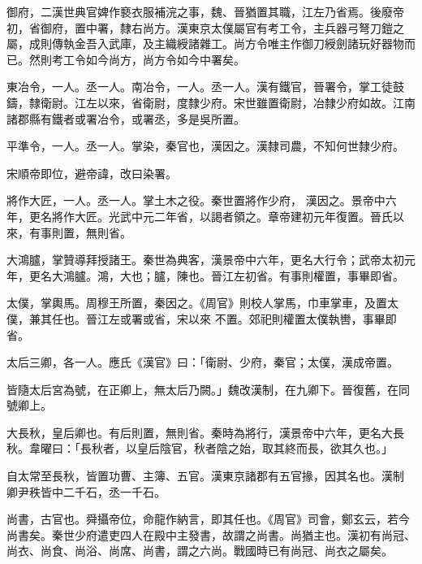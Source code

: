 \begin{pinyinscope}
 御府，二漢世典官婢作褻衣服補浣之事，魏、晉猶置其職，江左乃省焉。後廢帝初，省御府，置中署，隸右尚方。漢東京太僕屬官有考工令，主兵器弓弩刀鎧之屬，成則傳執金吾入武庫，及主織綬諸雜工。尚方令唯主作御刀綬劍諸玩好器物而已。然則考工令如今尚方，尚方令如今中署矣。



 東冶令，一人。丞一人。南冶令，一人。丞一人。漢有鐵官，晉署令，掌工徒鼓鑄，隸衛尉。江左以來，省衛尉，度隸少府。宋世雖置衛尉，冶隸少府如故。江南諸郡縣有鐵者或署冶令，或署丞，多是吳所置。



 平準令，一人。丞一人。掌染，秦官也，漢因之。漢隸司農，不知何世隸少府。



 宋順帝即位，避帝諱，改曰染署。



 將作大匠，一人。丞一人。掌土木之役。秦世置將作少府，
 漢因之。景帝中六年，更名將作大匠。光武中元二年省，以謁者領之。章帝建初元年復置。晉氏以來，有事則置，無則省。



 大鴻臚，掌贊導拜授諸王。秦世為典客，漢景帝中六年，更名大行令；武帝太初元年，更名大鴻臚。鴻，大也；臚，陳也。晉江左初省。有事則權置，事畢即省。



 太僕，掌輿馬。周穆王所置，秦因之。《周官》則校人掌馬，巾車掌車，及置太僕，兼其任也。晉江左或署或省，宋以來
 不置。郊祀則權置太僕執轡，事畢即省。



 太后三卿，各一人。應氏《漢官》曰：「衛尉、少府，秦官；太僕，漢成帝置。



 皆隨太后宮為號，在正卿上，無太后乃闕。」魏改漢制，在九卿下。晉復舊，在同號卿上。



 大長秋，皇后卿也。有后則置，無則省。秦時為將行，漢景帝中六年，更名大長秋。韋曜曰：「長秋者，以皇后陰官，秋者陰之始，取其終而長，欲其久也。」



 自太常至長秋，皆置功曹、主簿、五官。漢東京諸郡有五官掾，因其名也。漢制
 卿尹秩皆中二千石，丞一千石。



 尚書，古官也。舜攝帝位，命龍作納言，即其任也。《周官》司會，鄭玄云，若今尚書矣。秦世少府遣吏四人在殿中主發書，故謂之尚書。尚猶主也。漢初有尚冠、尚衣、尚食、尚浴、尚席、尚書，謂之六尚。戰國時已有尚冠、尚衣之屬矣。




\end{pinyinscope}

